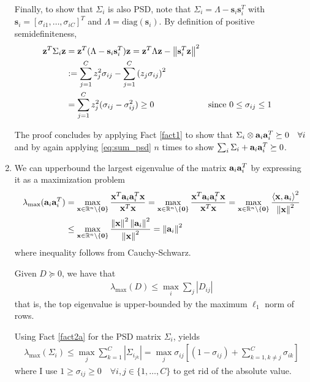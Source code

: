 \documentclass{article}
\begin{document}
\begin{enumerate}[label=1.I.\arabic*]
    Finally, to show that $\Sigma_i$ is also PSD, note that $\Sigma_i = \Lambda - \mathbf{s}_i \mathbf{s}_i^T $ with $\mathbf{s}_i =[\sigma_{i1},\dots, \sigma_{iC}]^T$ and $\Lambda=\text{diag}(\mathbf{s}_i)$. By definition of positive semidefiniteness,
    \begin{align}
        \zz^T \Sigma_i \zz &= \zz^T (\Lambda - \mathbf{s}_i \mathbf{s}_i^T)\zz = \zz^T \Lambda \zz - \norm{\mathbf{s}_i^T \zz}^2 \\
        &:= \sum_{j=1}^{C} z_j^2 \sigma_{ij} - \sum_{j=1}^{C} \left(z_j \sigma_{ij}\right)^2 \\
        &= \sum_{j=1}^{C} z_j^2 (\sigma_{ij} - \sigma_{ij}^2) \geq 0 &&\text{since $0\leq \sigma_{ij} \leq 1$}
    \end{align}
    
    The proof concludes by applying Fact \ref{fact1} to show that $\Sigma_i \otimes \aa_i \aa_i^T \succeq 0 \quad \forall i$ and by again applying \eqref{eq:sum_psd} $n$ times to show $\sum_i \Sigma_i + \aa_i \aa_i^T \succeq 0$.
    \item We can upperbound the largest eigenvalue of the matrix $\aa_i \aa_i^T$ by expressing it as a maximization problem
    \begin{align}
        \lambda_{\max} (\aa_i \aa_i^T) &= \max_{\xx \in \R^n\setminus\{\0\}} \frac{\xx^T \aa_i \aa_i^T \xx}{\xx^T \xx} = \max_{\xx \in \R^n\setminus\{\0\}}\frac{\xx^T \aa_i \aa_i^T \xx}{\xx^T \xx} = \max_{\xx \in \R^n\setminus\{\0\}}\frac{\lin{\xx, \aa_i}^2}{\norm{\xx}^2} \\
        &\leq \max_{\xx \in \R^n\setminus\{\0\}} \frac{\norm{\xx}^2 \norm{\aa_i}^2}{\norm{\xx}^2}  = \norm{\aa_i}^2
    \end{align}
    where inequality follows from Cauchy-Schwarz.
    
    \begin{fact}
        Given $D\succeq 0$, we have that
        \begin{align}
            \lambda_{\max} (D)\leq \max_i \sum_j |D_{ij}|
        \end{align}
        that is, the top eigenvalue is upper-bounded by the maximum $\ell_1$ norm of rows.
        \label{fact2a}
    \end{fact}
    
    Using Fact \ref{fact2a} for the PSD matrix $\Sigma_i$, yields
    \begin{align}
        \lambda_{\max} (\Sigma_i) \leq \max_j \sum_{k=1}^C |\Sigma_{i_{jk}}|  = \max_j \sigma_{ij} \left[(1-\sigma_{ij})+\sum_{k=1, k\neq j}^C \sigma_{ik} \right]
    \end{align}
    where I use $1 \geq \sigma_{ij} \geq 0 \quad \forall i,j \in \{1,\dots, C\}$ to get rid of the absolute value.
    

\end{enumerate}
\end{document}
